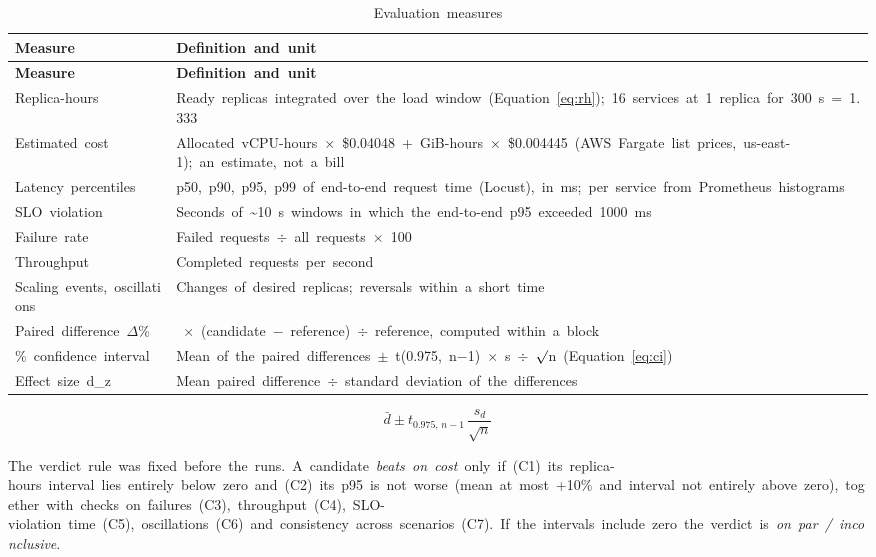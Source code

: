 \documentclass[12pt,a4paper,oneside]{report}
\begin{document}
\begingroup\small\setlength{\tabcolsep}{4pt}\renewcommand{\arraystretch}{1.25}
\begin{longtable}{|>{\raggedright\arraybackslash}p{4.01cm}|>{\raggedright\arraybackslash}p{10.85cm}|}
\caption{Evaluation~measures}\label{tab:metrics}\\\hline
\textbf{Measure} & \textbf{Definition~and~unit}\\\hline\endfirsthead
\hline \textbf{Measure} & \textbf{Definition~and~unit}\\\hline\endhead
Replica-hours & Ready~replicas~integrated~over~the~load~window~(Equation~\ref{eq:rh});~16~services~at~1~replica~for~300~s~=~1.333\\\hline
Estimated~cost & Allocated~vCPU-hours~$\times$~\$0.04048~+~GiB-hours~$\times$~\$0.004445~(AWS~Fargate~list~prices,~us-east-1);~an~estimate,~not~a~bill\\\hline
Latency~percentiles & p50,~p90,~p95,~p99~of~end-to-end~request~time~(Locust),~in~ms;~per~service~from~Prometheus~histograms\\\hline
SLO~violation & Seconds~of~\textasciitilde{}10~s~windows~in~which~the~end-to-end~p95~exceeded~1000~ms\\\hline
Failure~rate & Failed~requests~$\div$~all~requests~$\times$~100\\\hline
Throughput & Completed~requests~per~second\\\hline
Scaling~events,~oscillations & Changes~of~desired~replicas;~reversals~within~a~short~time\\\hline
Paired~difference~$\Delta$\% & 100~$\times$~(candidate~$-$~reference)~$\div$~reference,~computed~within~a~block\\\hline
95\%~confidence~interval & Mean~of~the~paired~differences~$\pm$~t(0.975,~n$-$1)~$\times$~s~$\div$~$\surd$n~(Equation~\ref{eq:ci})\\\hline
Effect~size~d\_z & Mean~paired~difference~$\div$~standard~deviation~of~the~differences\\\hline
\end{longtable}\endgroup

\begin{equation}\label{eq:ci}
\bar{d} \pm t_{0.975,\,n-1}\,\frac{s_d}{\sqrt{n}}
\end{equation}

The~verdict~rule~was~fixed~before~the~runs.~A~candidate~\textit{beats~on~cost}~only~if~(C1)~its~replica-hours~interval~lies~entirely~below~zero~and~(C2)~its~p95~is~not~worse~(mean~at~most~+10\%~and~interval~not~entirely~above~zero),~together~with~checks~on~failures~(C3),~throughput~(C4),~SLO-violation~time~(C5),~oscillations~(C6)~and~consistency~across~scenarios~(C7).~If~the~intervals~include~zero~the~verdict~is~\textit{on~par~/~inconclusive}.
\end{document}
